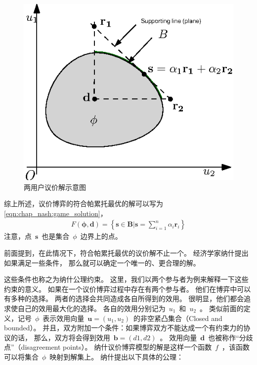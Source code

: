 \begin{figure}[!tb] 
    \centering
   \begin{minipage}[t]{0.6\linewidth} 
    \centering 
    \includegraphics[width = \textwidth]{chap_nash_2_dim_nash_bargain.eps} 
    \caption{两用户议价解示意图} 
    \label{fig:chap_bargain:2_dim_nash_bargain} 
  \end{minipage}%
\end{figure}

综上所述，议价博弈的符合帕累托最优的解可以写为\eqref{eqn:chap_nash:game_solution}，
\begin{align}
    F(\mathbf{\phi},\mathbf{d}) = \left\{ \mathbf{s} \in \mathbf{B} \big \vert \mathbf{s} = \sum_{i=1}^n \alpha_i \mathbf{r}_i \right\}
    \label{eqn:chap_nash:game_solution}
\end{align}
注意，点~$\mathbf{s}$~也是集合~$\phi$~边界上的点。

前面提到，在此情况下，符合帕累托最优的议价解不止一个。
经济学家纳什提出如果满足一些条件，
那么就可以确定一个唯一的、更合理的解\cite{Nash_1950}。

这些条件也称之为纳什公理约束。
这里，我们以两个参与者为例来解释一下这些约束的意义。
如果在一个议价博弈过程中存在有两个参与者。
他们在博弈中可以有多种的选择。
两者的选择会共同造成各自所得到的效用。
很明显，他们都会追求使自己的效用最大化的选择。
各自的效用分别记为~$u_1$~和~$u_2$~。
类似前面的定义，记号~$\phi$~表示效用向量~$\mathbf{u}=(u_1, u_2)$~的非空紧凸集合（Closed and bounded）。
并且，双方附加一个条件：如果博弈双方不能达成一个有约束力的协议的话，
那么，双方将会得到效用~$\mathbf{b}=(d1, d2)$~。
效用向量~$\mathbf{d}$~也被称作“分歧点”（disagreement points）。
纳什议价博弈模型的解是这样一个函数~$f$~，该函数可以将集合~$\phi$~映射到解集上。
纳什提出以下具体的公理：

